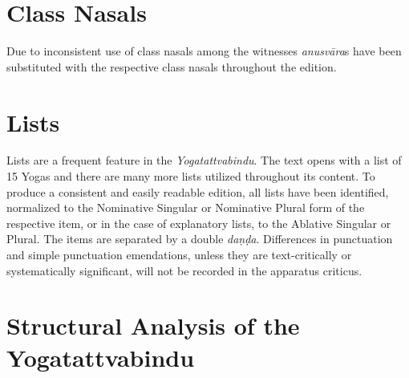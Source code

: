 \section{Class Nasals}

Due to inconsistent use of class nasals among the witnesses \textit{anusvāra}s have been substituted with the respective class nasals throughout the edition.

\section{Lists}

Lists are a frequent feature in the \textit{Yogatattvabindu}. The text opens with a list of 15 Yogas and there are many more lists utilized throughout its content. To produce a consistent and easily readable edition, all lists have been identified, normalized to the Nominative Singular or Nominative Plural form of the respective item, or in the case of explanatory lists, to the Ablative Singular or Plural. The items are separated by a double \textit{daṇḍa}. Differences in punctuation and simple punctuation emendations, unless they are text-critically or systematically significant, will not be recorded in the apparatus criticus.
\clearpage

\section{Structural Analysis of the Yogatattvabindu}

